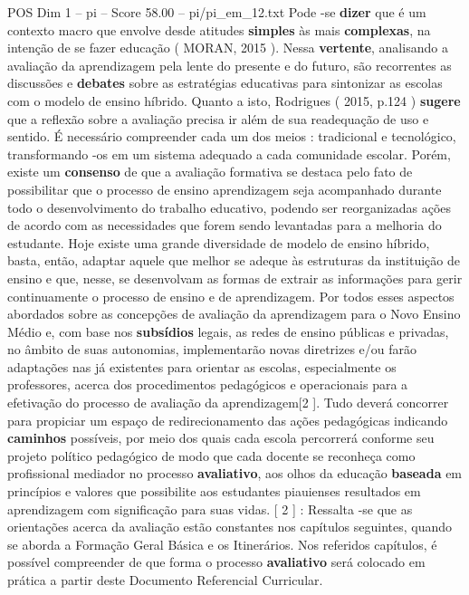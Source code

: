 \begin{textsample}{POS Dim 1 – pi – Score 58.00 – pi/pi\_em\_12.txt}
Pode -se \textbf{dizer} que é um contexto macro que envolve desde atitudes \textbf{simples} às mais \textbf{complexas}, na intenção de se fazer educação ( MORAN, 2015 ).
Nessa \textbf{vertente}, analisando a avaliação da aprendizagem pela lente do presente e do futuro, são recorrentes as discussões e \textbf{debates} sobre as estratégias educativas para sintonizar as escolas com o modelo de ensino híbrido.
Quanto a isto, Rodrigues ( 2015, p.124 ) \textbf{sugere} que a reflexão sobre a avaliação precisa ir além de sua readequação de uso e sentido.
É necessário compreender cada um dos meios : tradicional e tecnológico, transformando -os em um sistema adequado a cada comunidade escolar.
Porém, existe um \textbf{consenso} de que a avaliação formativa se destaca pelo fato de possibilitar que o processo de ensino aprendizagem seja acompanhado durante todo o desenvolvimento do trabalho educativo, podendo ser reorganizadas ações de acordo com as necessidades que forem sendo levantadas para a melhoria do estudante.
Hoje existe uma grande diversidade de modelo de ensino híbrido, basta, então, adaptar aquele que melhor se adeque às estruturas da instituição de ensino e que, nesse, se desenvolvam as formas de extrair as informações para gerir continuamente o processo de ensino e de aprendizagem.
Por todos esses aspectos abordados sobre as concepções de avaliação da aprendizagem para o Novo Ensino Médio e, com base nos \textbf{subsídios} legais, as redes de ensino públicas e privadas, no âmbito de suas autonomias, implementarão novas diretrizes e/ou farão adaptações nas já existentes para orientar as escolas, especialmente os professores, acerca dos procedimentos pedagógicos e operacionais para a efetivação do processo de avaliação da aprendizagem[2 ].
Tudo deverá concorrer para propiciar um espaço de redirecionamento das ações pedagógicas indicando \textbf{caminhos} possíveis, por meio dos quais cada escola percorrerá conforme seu projeto político pedagógico de modo que cada docente se reconheça como profissional mediador no processo \textbf{avaliativo}, aos olhos da educação \textbf{baseada} em princípios e valores que possibilite aos estudantes piauienses resultados em aprendizagem com significação para suas vidas. [ 2 ] : Ressalta -se que as orientações acerca da avaliação estão constantes nos capítulos seguintes, quando se aborda a Formação Geral Básica e os Itinerários.
Nos referidos capítulos, é possível compreender de que forma o processo \textbf{avaliativo} será colocado em prática a partir deste Documento Referencial Curricular.

\end{textsample}
